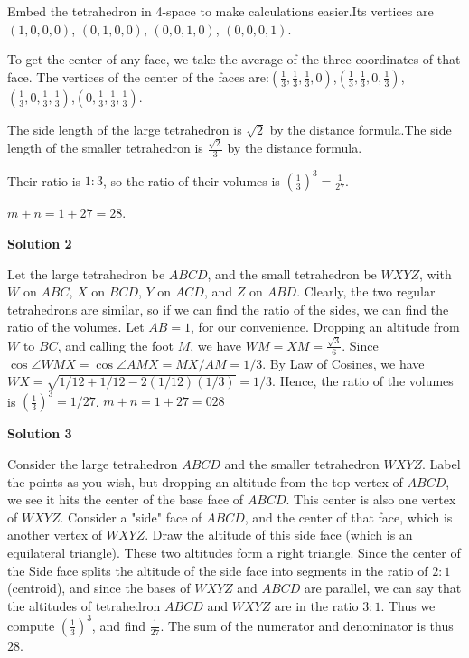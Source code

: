 \begin{enumerate}
Embed the tetrahedron in 4-space to make calculations easier.Its vertices are$(1,0,0,0)$, $(0,1,0,0)$, $(0,0,1,0)$, $(0,0,0,1)$.

 To get the center of any face, we take the average of the three coordinates of that face. The vertices of the center of the faces are:$(\frac{1}{3}, \frac{1}{3}, \frac{1}{3}, 0)$,$(\frac{1}{3}, \frac{1}{3},0, \frac{1}{3})$,$(\frac{1}{3},0, \frac{1}{3}, \frac{1}{3})$,$(0,\frac{1}{3}, \frac{1}{3}, \frac{1}{3})$.

 The side length of the large tetrahedron is $\sqrt{2}$ by the distance formula.The side length of the smaller tetrahedron is $\frac{\sqrt{2}}{3}$ by the distance formula.

 Their ratio is $1:3$, so the ratio of their volumes is $\left(\frac{1}{3}\right)^3 = \frac{1}{27}$.

 $m+n = 1 + 27 = \boxed{28}$.

 



\textbf{Solution 2}

Let the large tetrahedron be $ABCD$, and the small tetrahedron be $WXYZ$, with $W$ on $ABC$, $X$ on $BCD$, $Y$ on $ACD$, and $Z$ on $ABD$. Clearly, the two regular tetrahedrons are similar, so if we can find the ratio of the sides, we can find the ratio of the volumes. Let $AB=1$, for our convenience. Dropping an altitude from $W$ to $BC$, and calling the foot $M$, we have $WM=XM=\frac{\sqrt3}{6}$. Since $\cos\angle{WMX}=\cos\angle{AMX}=MX/AM=1/3$. By Law of Cosines, we have $WX=\sqrt{1/12+1/12-2(1/12)(1/3)}=1/3$. Hence, the ratio of the volumes is $\left(\frac{1}{3}\right)^3=1/27$. $m+n=1+27=\boxed{028}$




\textbf{Solution 3}

Consider the large tetrahedron $ABCD$ and the smaller tetrahedron $WXYZ$.  Label the points as you wish, but dropping an altitude from the top vertex of $ABCD$, we see it hits the center of the base face of $ABCD$.  This center is also one vertex of $WXYZ$.  Consider a "side" face of $ABCD$, and the center of that face, which is another vertex of $WXYZ$.  Draw the altitude of this side face (which is an equilateral triangle).  These two altitudes form a right triangle.  Since the center of the Side face splits the altitude of the side face into segments in the ratio of $2:1$ (centroid), and since the bases of $WXYZ$ and $ABCD$ are parallel, we can say that the altitudes of tetrahedron $ABCD$ and $WXYZ$ are in the ratio $3:1$.  Thus we compute $\left(\frac{1}{3}\right)^3$, and find $\frac{1}{27}$.  The sum of the numerator and denominator is thus $28$.


\end{enumerate}
